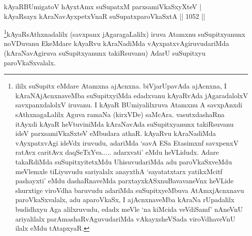 
\begin{shl}
kAyaRBUmigatoV hAyxtAmx suSupatxM parxsamiVkaSxyXteV | \\
kAyaRsayx kAraNavAyxpetxVnaR suSupatxparoVkaSxtA \hfill||  1052 ||  
\end{shl}

\begin{artha}
\footnote{ililx suSupitx eMdare Atamxna ajAcnxna. biVjarUpavAda ajAcnxna, I kAraNAjAcnxnaveMba suSupitxyiMda edadxvanu kAyaRvAda jAgaradalolxV savxpanxdalolxV iruvanu. I kAyaR BUmiyalilxruva Atamxnu A savxpAnxdi sAthxnagaLalilx Aguva ramaNa (kirxVDe) saMcAra. vasutxdashaRna itAyxdi kAyaR heVtuviniMda kAraNavAda suSupitxyanunx takiRsuvanu ideV parxsamiVkaSxteV eMbudara athaR. kAyaRvu kAraNadiMda vAyxpatxvAgi ideVdx iruvudu, adariMda `savA ESa Etasimxnf savxpenxV ratAvx caritAvx daqSeTxYva..... adarxvati' eMdu heVLidudx. Adare takaRdiMda suSupitxyitetxMdu UhisuvudariMda adu paroVkaSxveMdu meVlemxle tiLiyuvudu sariyalalx anayxthA `sayatatxtarx yatikxMcitf pashayxti' eMdu dashaRnaveMda parxtayxkASxnuBavavaneVnx heVLide shurxtige viroVdha baruvudu adariMda suSupitxyeMbuva AtAmxjAcnxnavu paroVkaSxvalalx, adu aparoVkaSx, I ajAcnxnaveMba kAraNa rUpadalilx budidhxyu Aga alilxruvudu, edadx meVle `na kiMcida veVdiSamf' nAneVnU ariyalilalx parAmashaRvAguvudariMda vAkayxsheVSada viroVdhaveVnU ilalx eMdu tAtapxyaR.}kAyaRsAthxnadalilx (savxpanx jAgaragaLalilx) iruva Atamxnu suSupitxyanunx noVDuvanu EkeMdare kAyaRvu kAraNadiMda vAyxpatxvAgiruvudariMda (kAraNavAgiruva suSupitxyanunx takiRsuvanu) AdarU suSupitxyu paroVkaSxvalalx.
\end{artha}


